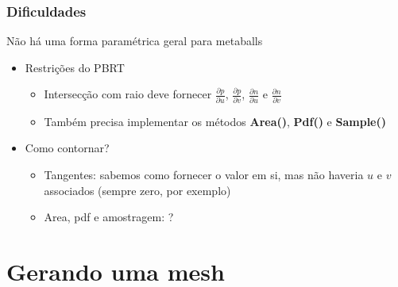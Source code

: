\documentclass[brazil]{beamer}
\begin{document}
      \begin{frame}
        \frametitle{Dificuldades}
        Não há uma forma paramétrica geral para metaballs
        \begin{itemize}
          \vspace{1em}
          \pause
          \item
            Restrições do PBRT
            \begin{itemize}
              \item Intersecção com raio deve fornecer
                    $\frac{\partial p}{\partial u}$,
                    $\frac{\partial p}{\partial v}$,
                    $\frac{\partial n}{\partial u}$ e
                    $\frac{\partial n}{\partial v}$
              \item Também precisa implementar os métodos
                    \textbf{Area()}, \textbf{Pdf()} e \textbf{Sample()}
            \end{itemize}
          \vspace{1em}
          \pause
          \item
            Como contornar?
            \begin{itemize}
              \item Tangentes: sabemos como fornecer o valor em si, mas não
                    haveria $u$ e $v$ associados (sempre zero, por exemplo)
              \item Area, pdf e amostragem: ?
            \end{itemize}
        \end{itemize}
      \end{frame}
      
  
  \section{Gerando uma mesh}
  
    \subsection{}
    
\end{document}
